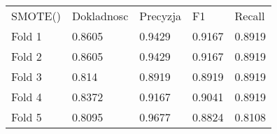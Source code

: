 \begin{tabular}{lllll}
\hline
 SMOTE() & Dokladnosc & Precyzja & F1     & Recall \\
 Fold 1  & 0.8605     & 0.9429   & 0.9167 & 0.8919 \\
 Fold 2  & 0.8605     & 0.9429   & 0.9167 & 0.8919 \\
 Fold 3  & 0.814      & 0.8919   & 0.8919 & 0.8919 \\
 Fold 4  & 0.8372     & 0.9167   & 0.9041 & 0.8919 \\
 Fold 5  & 0.8095     & 0.9677   & 0.8824 & 0.8108 \\
\hline
\end{tabular}